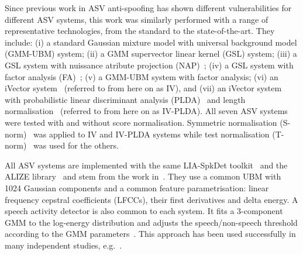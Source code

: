 
Since previous work in ASV anti-spoofing has shown different vulnerabilities for different ASV systems, this work was similarly performed with a range of representative technologies, from the standard to the state-of-the-art.
They include: 
(i) a standard Gaussian mixture model with universal background model (GMM-UBM) system;
(ii) a GMM supervector linear kernel (GSL) system;
(iii) a GSL system with nuissance atribute projection (NAP)~\cite{Campbell2006};
(iv) a GSL system with factor analysis (FA)~\cite{Fauve2007};
(v) a GMM-UBM system with factor analysis;
(vi) an iVector system~\cite{Dehak2011} (referred to from here on as IV), and 
(vii) an iVector system  with probabilistic linear discriminant analysis (PLDA)~\cite{Li2012} and length normalisation~\cite{Garcia2011} (referred to from here on as IV-PLDA). 
All seven ASV systems were tested with and without score normalisation.  
Symmetric normalisation (S-norm)~\cite{Kenny2010} was applied to IV and IV-PLDA systems while test normalisation (T-norm)~\cite{Auckenthaler2000} was used for the others.

All ASV systems are implemented with the same LIA-SpkDet toolkit~\cite{Bonastre2008} and the ALIZE library~\cite{Bonastre2004} and stem from the work in~\cite{Fauve2007}.
They use a common UBM with 1024 Gaussian components and a common feature parametrisation: linear frequency cepstral coefficients (LFCCs), their first derivatives and delta energy. 
A speech activity detector is also common to each system.  
It fits a 3-component GMM to the log-energy distribution and adjusts the speech/non-speech threshold according to the GMM parameters~\cite{Bimbot2004}.
This approach has been used successfully in many independent studies, e.g.~\cite{magrin2001,fauve2008}. 